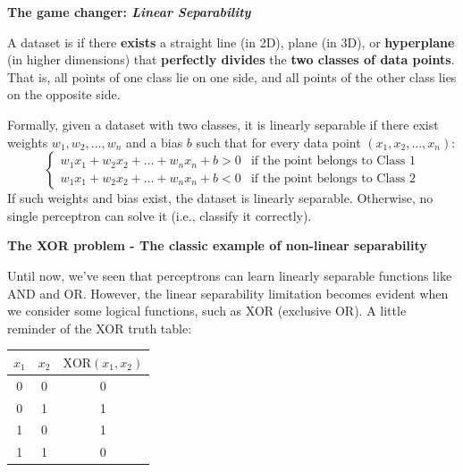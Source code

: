 \highspace
\begin{flushleft}
    \textcolor{Green3}{ \textbf{The game changer: \emph{Linear Separability}}}
\end{flushleft}
\begin{definitionbox}
    A dataset is  if there \textbf{exists} a straight line (in 2D), plane (in 3D), or \textbf{hyperplane} (in higher dimensions) that \textbf{perfectly divides} the \textbf{two classes of data points}. That is, all points of one class lie on one side, and all points of the other class lies on the opposite side.

    \highspace
    Formally, given a dataset with two classes, it is linearly separable if there exist weights $ w_1, w_2, \ldots, w_n $ and a bias $ b $ such that for every data point $ (x_1, x_2, \ldots, x_n) $:
    \begin{equation*}
        \begin{cases}
            w_1 x_1 + w_2 x_2 + \ldots + w_n x_n + b > 0 & \text{if the point belongs to Class 1} \\
            w_1 x_1 + w_2 x_2 + \ldots + w_n x_n + b < 0 & \text{if the point belongs to Class 2}
        \end{cases}
    \end{equation*}
    If such weights and bias exist, the dataset is linearly separable. Otherwise, no single perceptron can solve it (i.e., classify it correctly).
\end{definitionbox}

\newpage

\begin{flushleft}
    \textcolor{Red2}{ \textbf{The XOR problem - The classic example of non-linear separability}}
    \label{sec:xor-problem}
\end{flushleft}
Until now, we've seen that perceptrons can learn linearly separable functions like AND and OR. However, the linear separability limitation becomes evident when we consider some logical functions, such as XOR (exclusive OR). A little reminder of the XOR truth table:
\begin{table}[!htp]
    \centering
    \begin{tabular}{@{} c c c @{}}
        \toprule
        $ x_1 $ & $ x_2 $ & $ \text{XOR}(x_1, x_2) $ \\
        \midrule
        0 & 0 & 0 \\
        0 & 1 & 1 \\
        1 & 0 & 1 \\
        1 & 1 & 0 \\
        \bottomrule
    \end{tabular}
\end{table}

